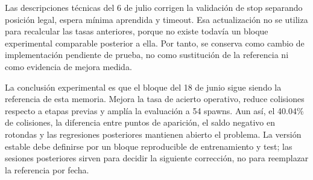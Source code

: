 Las descripciones técnicas del 6 de julio corrigen la validación de stop separando posición legal, espera mínima aprendida y timeout. Esa actualización no se utiliza para recalcular las tasas anteriores, porque no existe todavía un bloque experimental comparable posterior a ella. Por tanto, se conserva como cambio de implementación pendiente de prueba, no como sustitución de la referencia ni como evidencia de mejora medida.

La conclusión experimental es que el bloque del 18 de junio sigue siendo la referencia de esta memoria. Mejora la tasa de acierto operativo, reduce colisiones respecto a etapas previas y amplía la evaluación a 54 spawns. Aun así, el 40.04\% de colisiones, la diferencia entre puntos de aparición, el saldo negativo en rotondas y las regresiones posteriores mantienen abierto el problema. La versión estable debe definirse por un bloque reproducible de entrenamiento y test; las sesiones posteriores sirven para decidir la siguiente corrección, no para reemplazar la referencia por fecha.
